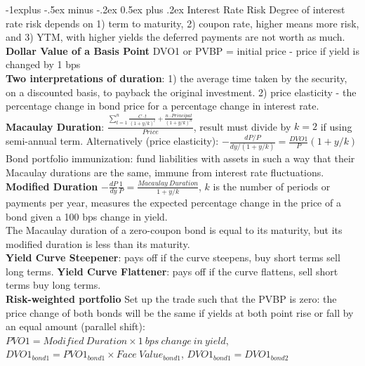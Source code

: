 \documentclass[10pt,landscape]{article}
\makeatletter
\renewcommand{\subsection}{\@startsection{subsection}{2}{0mm}%
                                {-1explus -.5ex minus -.2ex}%
                                {0.5ex plus .2ex}%
                                {\normalfont\normalsize\bfseries}}
\makeatother
\begin{document}
\raggedright
\footnotesize
\begin{multicols}{3}


\setlength{\premulticols}{1pt}
\setlength{\postmulticols}{1pt}
\setlength{\multicolsep}{1pt}
\setlength{\columnsep}{2pt}

\subsection{Interest Rate Risk}
Degree of interest rate risk depends on 1) term to maturity, 2) coupon rate, higher means more risk, and 3) YTM, with higher yields the deferred payments are not worth as much.\\
{\bf Dollar Value of a Basis Point} DVO1 or PVBP = initial price - price if yield is changed by 1 bps\\
{\bf Two interpretations of duration}: 1) the average time taken by the security, on a discounted basis, to payback the original investment. 2) price elasticity - the percentage change in bond price for a percentage change in interest rate.\\
{\bf Macaulay Duration}: $\frac{\sum_{t=1}^{n} \frac{C \cdot t}{(1+y/k)^t} + \frac{n \cdot Principal}{(1+y/k)^n}}{Price}$, result must divide by $k=2$ if using semi-annual term. Alternatively (price elasticity): $-\frac{dP/P}{dy/(1+y/k)} = \frac{DVO1}{P}(1+y/k)$\\
Bond portfolio immunization: fund liabilities with assets in such a way that their Macaulay durations are the same, immune from interest rate fluctuations.\\
{\bf Modified Duration} $- \frac{dP}{dy}\frac{1}{P} = \frac {Macaulay \ Duration}{1+y/k}$, $k$ is the number of periods or payments per year, measures the expected percentage change in the price of a bond given a 100 bps change in yield.\\
The Macaulay duration of a zero-coupon bond is equal to its maturity, but its modified duration is less than its maturity.\\
{\bf Yield Curve Steepener}: pays off if the curve steepens, buy short terms sell long terms. {\bf Yield Curve Flattener}: pays off if the curve flattens, sell short terms buy long terms.\\
{\bf Risk-weighted portfolio} Set up the trade such that the PVBP is zero: the price change of both bonds will be the same if yields at both point rise or fall by an equal amount (parallel shift): $PVO1 = Modified \ Duration \times 1\ bps\ change\ in\ yield$, ${DVO1}_{bond 1} = {PVO1}_{bond 1} \times {Face\ Value}_{bond 1}$, ${DVO1}_{bond 1} = {DVO1}_{bond 2}$\\

\end{multicols}
\end{document}
